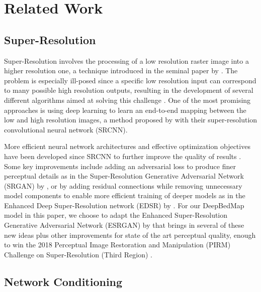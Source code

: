 \documentclass[tc, manuscript]{copernicus}
\begin{document}
\section{Related Work}

\subsection{Super-Resolution}

Super-Resolution involves the processing of a low resolution raster image into a higher resolution one, a technique introduced in the seminal paper by \citet{TsaiMultiframeimagerestoration1984}.
The problem is especially ill-posed since a specific low resolution input can correspond to many possible high resolution outputs, resulting in the development of several different algorithms aimed at solving this challenge \citep[see][for a review]{NasrollahiSuperresolutioncomprehensivesurvey2014}.
One of the most promising approaches is using deep learning to learn an end-to-end mapping between the low and high resolution images, a method proposed by \citet{DongImageSuperResolutionUsing2014} with their super-resolution convolutional neural network (SRCNN).

More efficient neural network architectures and effective optimization objectives have been developed since SRCNN to further improve the quality of results \cite[see][for a review]{YangDeepLearningSingle2018}.
Some key improvements include adding an adversarial loss to produce finer perceptual details as in the Super-Resolution Generative Adversarial Network (SRGAN) by \citet{LedigPhotoRealisticSingleImage2016}, or by adding residual connections while removing unnecessary model components to enable more efficient training of deeper models as in the Enhanced Deep Super-Resolution network (EDSR) by \citet{LimEnhancedDeepResidual2017}.
For our DeepBedMap model in this paper, we choose to adapt the Enhanced Super-Resolution Generative Adversarial Network (ESRGAN) by \citet{WangESRGANEnhancedSuperResolution2018} that brings in several of these new ideas plus other improvements for state of the art perceptual quality, enough to win the 2018 Perceptual Image Restoration and Manipulation (PIRM) Challenge on Super-Resolution (Third Region) \citep{Blau2018PIRMChallenge2018}.

\subsection{Network Conditioning}
\end{document}
